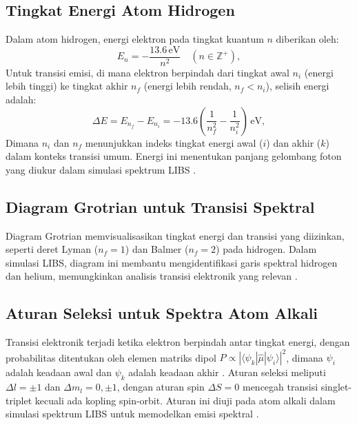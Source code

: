 \subsection{Tingkat Energi Atom Hidrogen}
Dalam atom hidrogen, energi elektron pada tingkat kuantum \( n \) diberikan oleh:
\begin{equation}
E_n = -\frac{13.6 \, \text{eV}}{n^2} \quad (n \in \mathbb{Z}^+), \label{energy_hydrogen}
\end{equation}
Untuk transisi emisi, di mana elektron berpindah dari tingkat awal \( n_i \) (energi lebih tinggi) ke tingkat akhir \( n_f \) (energi lebih rendah, \( n_f < n_i \)), selisih energi adalah:
\begin{equation}
\Delta E = E_{n_f} - E_{n_i} = -13.6 \left( \frac{1}{n_f^2} - \frac{1}{n_i^2} \right) \, \text{eV}, \label{deltaE}
\end{equation}
Dimana \( n_i \) dan \( n_f \) menunjukkan indeks tingkat energi awal (\( i \)) dan akhir (\( k \)) dalam konteks transisi umum. Energi ini menentukan panjang gelombang foton yang diukur dalam simulasi spektrum LIBS \citep{Griffiths2005}.

\subsection{Diagram Grotrian untuk Transisi Spektral}
Diagram Grotrian memvisualisasikan tingkat energi dan transisi yang diizinkan, seperti deret Lyman (\( n_f = 1 \)) dan Balmer (\( n_f = 2 \)) pada hidrogen. Dalam simulasi LIBS, diagram ini membantu mengidentifikasi garis spektral hidrogen dan helium, memungkinkan analisis transisi elektronik yang relevan \citep{Mason2015}.

\subsection{Aturan Seleksi untuk Spektra Atom Alkali}
Transisi elektronik terjadi ketika elektron berpindah antar tingkat energi, dengan probabilitas ditentukan oleh elemen matriks dipol \( P \propto |\langle \psi_k | \hat{\mu} | \psi_i \rangle|^2 \), dimana \( \psi_i \) adalah keadaan awal dan \( \psi_k \) adalah keadaan akhir \citep{Demtroder2010}. Aturan seleksi meliputi \( \Delta l = \pm 1 \) dan \( \Delta m_l = 0, \pm 1 \), dengan aturan spin \( \Delta S = 0 \) mencegah transisi singlet-triplet kecuali ada kopling spin-orbit. Aturan ini diuji pada atom alkali dalam simulasi spektrum LIBS untuk memodelkan emisi spektral \citep{Griffiths2005}.

